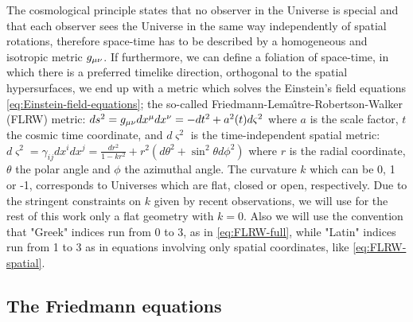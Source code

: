 The cosmological principle states
that no observer in the Universe is special and that each observer sees the Universe in the same way independently of
spatial rotations, therefore space-time has to be described by a homogeneous and isotropic metric $g_{\mu \nu}$.
If furthermore, we can define a foliation of space-time, in which there is a preferred timelike direction, orthogonal
to the spatial hypersurfaces, we end up with a metric which solves the Einstein's field equations \ref{eq:Einstein-field-equations};
the so-called Friedmann-Lema\^{\i}tre-Robertson-Walker (FLRW) metric:
\beeqc$\label{eq:FLRW-full}
ds^2 = g_{\mu \nu} dx^\mu dx^\nu = -dt^2 + a^2 (t) d\varsigma^2 
$
where $a$ is the scale factor, $t$ the cosmic time coordinate, and $d\varsigma^2$ is the time-independent spatial metric:
\beeqc$\label{eq:FLRW-spatial}
d\varsigma^2  = \gamma_{i j} dx^i dx^j = \frac{dr^2}{1-kr^2} + r^2(d\theta^2 + \sin^2 \theta d \phi^2)
$ 
where $r$ is the radial coordinate, $\theta$ the polar angle and $\phi$ the azimuthal angle.
The curvature $k$ which can be 0, 1 or -1, corresponds to Universes which are flat, closed or open, respectively.
Due to the stringent constraints on $k$ given by recent observations,
we will use for the rest of this work only a flat geometry with $k=0$.
Also we will use the convention that "Greek" indices run from 0 to 3, as in \cref{eq:FLRW-full},
while "Latin" indices run from 1 to 3 as in equations involving only spatial coordinates, like \cref{eq:FLRW-spatial}.


\subsection{The Friedmann equations \label{sub:Friedmann-eqs}}

